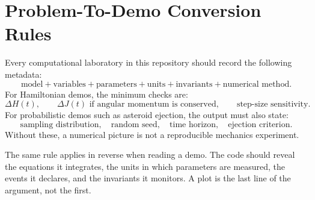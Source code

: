 \section{Problem-To-Demo Conversion Rules}
\label{sec:lab-demo-rules}

Every computational laboratory in this repository should record the following
metadata:
\[
  \text{model}+\text{variables}+\text{parameters}
  +\text{units}+\text{invariants}+\text{numerical method}.
\]
For Hamiltonian demos, the minimum checks are:
\[
  \Delta H(t),\qquad
  \Delta J(t) \text{ if angular momentum is conserved},\qquad
  \text{step-size sensitivity}.
\]
For probabilistic demos such as asteroid ejection, the output must also state:
\[
  \text{sampling distribution},\quad
  \text{random seed},\quad
  \text{time horizon},\quad
  \text{ejection criterion}.
\]
Without these, a numerical picture is not a reproducible mechanics experiment.

The same rule applies in reverse when reading a demo. The code should reveal
the equations it integrates, the units in which parameters are measured, the
events it declares, and the invariants it monitors. A plot is the last line of
the argument, not the first.

